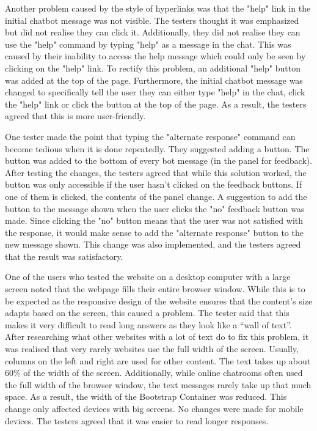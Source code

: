 \documentclass[12pt,a4paper]{article}
\begin{document}
Another problem caused by the style of hyperlinks was that the "help" link in the initial chatbot message was not visible. The testers thought it was emphasized but did not realise they can click it. Additionally, they did not realise they can use the "help" command by typing "help" as a message in the chat. This was caused by their inability to access the help message which could only be seen by clicking on the "help" link. To rectify this problem, an additional "help" button was added at the top of the page. Furthermore, the initial chatbot message was changed to specifically tell the user they can either type "help" in the chat, click the "help" link or click the button at the top of the page. As a result, the testers agreed that this is more user-friendly.

One tester made the point that typing the "alternate response" command can become tedious when it is done repeatedly. They suggested adding a button. The button was added to the bottom of every bot message (in the panel for feedback). After testing the changes, the testers agreed that while this solution worked, the button was only accessible if the user hasn't clicked on the feedback buttons. If one of them is clicked, the contents of the panel change. A suggestion to add the button to the message shown when the user clicks the "no" feedback button was made. Since clicking the "no" button means that the user was not satisfied with the response, it would make sense to add the "alternate response" button to the new message shown. This change was also implemented, and the testers agreed that the result was satisfactory.

One of the users who tested the website on a desktop computer with a large screen noted that the webpage fills their entire browser window. While this is to be expected as the responsive design of the website ensures that the content's size adapts based on the screen, this caused a problem. The tester said that this makes it very difficult to read long answers as they look like a “wall of text”. After researching what other websites with a lot of text do to fix this problem, it was realised that very rarely websites use the full width of the screen. Usually, columns on the left and right are used for other content. The text takes up about 60\% of the width of the screen. Additionally, while online chatrooms often used the full width of the browser window, the text messages rarely take up that much space. As a result, the width of the Bootstrap Container was reduced. This change only affected devices with big screens. No changes were made for mobile devices. The testers agreed that it was easier to read longer responses.
\end{document}
